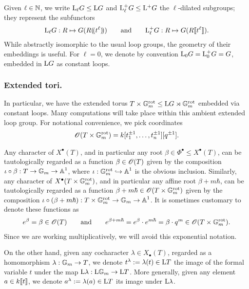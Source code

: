Given $\ell \in \operatorname{\mathbb{N}}$, we write $\mathrm{L}_{\ell} G \leq \mathrm{L} G$ and $\mathrm{L^+_{\ell}} G \leq \mathrm{L^+} G$ the $\ell$-dilated subgroups; they represent the subfunctors
\begin{equation*}
    \mathrm{L}_{\ell} G: R \mapsto G(R(\!( t^{\ell} )\!)) \qquad \text{and} \qquad \mathrm{L^+_{\ell}} G: R \mapsto G(R\llbracket t^{\ell} \rrbracket).
\end{equation*}
While abstractly isomorphic to the usual loop groups, the geometry of their embeddings is useful.
%
For $\ell = 0$, we denote by convention $\mathrm{L}_0 G = \mathrm{L^+_{0}} G = G$, embedded in $\mathrm{L} G$ as constant loops.


\subsubsection{Extended tori.}\label{subsubsection: extended tori}
In particular, we have the extended torus $T \times \mathbb{G}_m^{\mathrm{rot}} \leq \mathrm{L} G \rtimes \mathbb{G}_m^{\mathrm{rot}}$ embedded via constant loops.
Many computations will take place within this ambient extended loop group.
For notational convenience, we pick coordinates
\begin{equation*}
    \operatorname{\mathscr{O}}(T\times \mathbb{G}_m^{\mathrm{rot}}) = k[t_1^{\pm 1}, \dots, t_n^{\pm 1}][q^{\pm 1}].
\end{equation*}


Any character of $X^{\bullet}(T)$, and in particular any root $ \beta \in \Phi^{\bullet} \leq X^{\bullet}(T)$, can be tautologically regarded as a function $\beta \in \operatorname{\mathscr{O}}(T)$ given by the composition $\iota \circ \beta: T \to \mathbb{G}_m \to \operatorname{\mathbb{A}}^1$, where $\iota: \mathbb{G}_m^{\mathrm{rot}} \hookrightarrow \operatorname{\mathbb{A}}^1$ is the obvious inclusion.
%
Similarly, any character of $X^{\bullet}(T\times \mathbb{G}_m^{\mathrm{rot}})$, and in particular any affine root $\beta + m \hbar$, can be tautologically regarded as a function $\beta + m\hbar \in \operatorname{\mathscr{O}}(T \times \mathbb{G}_m^{\mathrm{rot}})$ given by the composition $\iota \circ (\beta + m\hbar): T \times \mathbb{G}_m^{\mathrm{rot}} \to \mathbb{G}_m \to \operatorname{\mathbb{A}}^1$.
%
It is sometimes customary to denote these functions as
\begin{equation*}
   e^{\beta} = \beta \in \operatorname{\mathscr{O}}(T) \qquad \text{and} \qquad e^{\beta + m\hbar} = e^{\beta} \cdot e^{m\hbar} = {\beta} \cdot q^m \in \operatorname{\mathscr{O}}(T \times \mathbb{G}_m^{\mathrm{rot}}).
\end{equation*}
Since we are working multiplicatively, we will avoid this exponential notation.



On the other hand, given any cocharacter $\lambda \in X_{\bullet}(T)$, regarded as a homomorphism $\lambda: \mathbb{G}_m \to T$, we denote $t^{\lambda} := \lambda(t) \in \mathrm{L} T$ the image of the formal variable $t$ under the map $\mathrm{L} \lambda: \mathrm{L} \mathbb{G}_m \to \mathrm{L} T$. More generally, given any element $a \in k \llbracket t \rrbracket$, we denote $a^{\lambda} := \lambda(a) \in \mathrm{L} T$ its image under $\mathrm{L} \lambda$.




